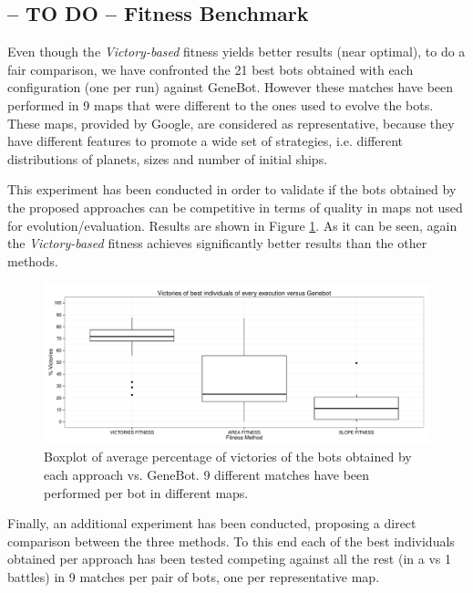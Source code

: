 \documentclass[preprint]{elsarticle}
\begin{document}
\subsection{-- TO DO -- Fitness Benchmark}

Even though the \textit{Victory-based} fitness yields better results
(near optimal), to do a fair comparison, we have confronted the 21
best bots obtained with each configuration (one per run) against
GeneBot. However these matches have been performed in 9 maps that were
different to the ones used to evolve the bots. These %
maps, provided by Google, are considered as representative, because they have different features to promote a wide set of strategies, i.e. different distributions of planets, sizes and number of initial ships. 

This experiment has been conducted in order to validate if the bots obtained by the proposed approaches can be competitive in terms of quality in maps not used for evolution/evaluation. Results are shown in Figure \ref{figura:boxplotvictoriesgenebot}. As it can be seen, again the \textit{Victory-based} fitness achieves significantly better results than the other methods.


\begin{figure}[ht]
 \begin{center}
   \includegraphics[width=12cm]{nuevas_imgs/vsGENEBOT_Boxplot.pdf}
 \end{center}
 \caption{Boxplot of average percentage of victories of the bots obtained by each approach vs. GeneBot. 9 different matches have been performed per bot in different maps.} 
 \label{figura:boxplotvictoriesgenebot}
 \end{figure}

Finally, an additional experiment has been conducted, proposing a direct comparison between the three methods. To this end each of the best individuals obtained per approach has been tested competing against all the rest (in a vs 1 battles) in 9 matches per pair of bots, one per representative map.
\end{document}
